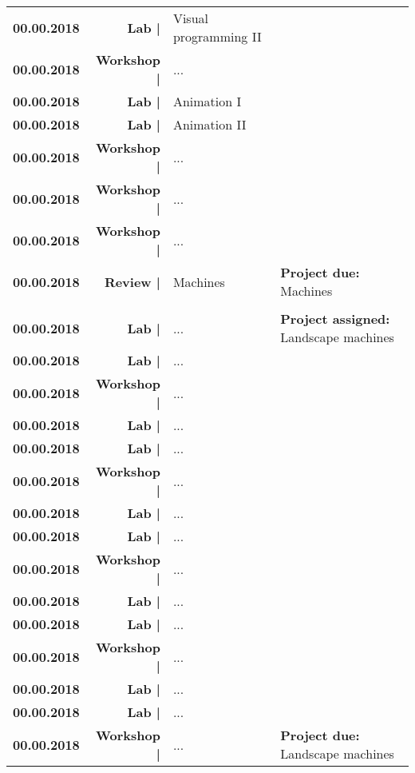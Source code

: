 \documentclass[11pt,article,oneside]{memoir}
\begin{document}
\begin{table}[H]
\begin{tabular}{l r @{\hskip 0.1cm} l @{\hskip 0.5cm} l}
\textbf{00.00.2018} & \textbf{Lab |} & Visual programming II\\ %
\textbf{00.00.2018} & \textbf{Workshop |} & ...\\ 
\textbf{00.00.2018} & \textbf{Lab |} & Animation I\\
\textbf{00.00.2018} & \textbf{Lab |} & Animation II\\
\textbf{00.00.2018} & \textbf{Workshop |} & ...\\
\textbf{00.00.2018} & \textbf{Workshop |} & ...\\
\textbf{00.00.2018} & \textbf{Workshop |} & ...\\
\textbf{00.00.2018} & \textbf{Review |} & Machines & \textbf{Project due:} Machines\\
\\
\textbf{00.00.2018} & \textbf{Lab |} & ... & \textbf{Project assigned:} Landscape machines\\
\textbf{00.00.2018} & \textbf{Lab |} & ...\\
\textbf{00.00.2018} & \textbf{Workshop |} & ...\\
\textbf{00.00.2018} & \textbf{Lab |} & ...\\
\textbf{00.00.2018} & \textbf{Lab |} & ...\\
\textbf{00.00.2018} & \textbf{Workshop |} & ...\\
\textbf{00.00.2018} & \textbf{Lab |} & ...\\
\textbf{00.00.2018} & \textbf{Lab |} & ...\\
\textbf{00.00.2018} & \textbf{Workshop |} & ...\\
\textbf{00.00.2018} & \textbf{Lab |} & ...\\
\textbf{00.00.2018} & \textbf{Lab |} & ...\\
\textbf{00.00.2018} & \textbf{Workshop |} & ...\\
\textbf{00.00.2018} & \textbf{Lab |} & ...\\
\textbf{00.00.2018} & \textbf{Lab |} & ...\\
\textbf{00.00.2018} & \textbf{Workshop |} & ... & \textbf{Project due:} Landscape machines\\
%
\end{tabular}
\end{table}

\clearpage

%
\end{document}
